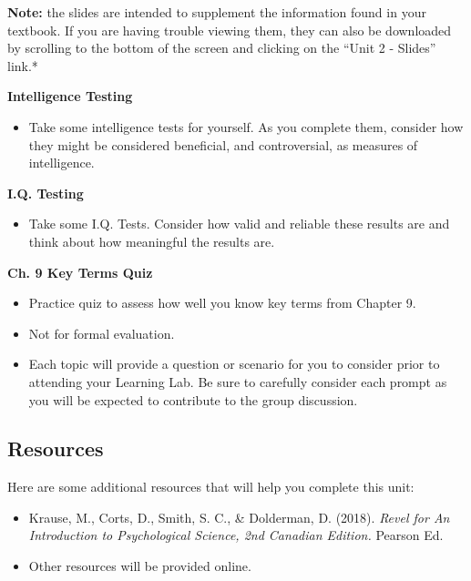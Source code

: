 \documentclass[
]{book}
\providecommand{\tightlist}{%
  \setlength{\itemsep}{0pt}\setlength{\parskip}{0pt}}
\begin{document}
\begin{caution}
\textbf{Note:} the slides are intended to supplement the information found in your textbook. If you are having trouble viewing them, they can also be downloaded by scrolling to the bottom of the screen and clicking on the ``Unit 2 - Slides'' link.*
\end{caution}

\begin{reflect}
\textbf{Intelligence Testing}

\begin{itemize}
\tightlist
\item
  Take some intelligence tests for yourself. As you complete them, consider how they might be considered beneficial, and controversial, as measures of intelligence.
\end{itemize}

\textbf{I.Q. Testing}

\begin{itemize}
\tightlist
\item
  Take some I.Q. Tests. Consider how valid and reliable these results are and think about how meaningful the results are.
\end{itemize}

\textbf{Ch. 9 Key Terms Quiz}

\begin{itemize}
\tightlist
\item
  Practice quiz to assess how well you know key terms from Chapter 9.\\
\item
  Not for formal evaluation.\\
\item
  Each topic will provide a question or scenario for you to consider prior to attending your Learning Lab. Be sure to carefully consider each prompt as you will be expected to contribute to the group discussion.
\end{itemize}
\end{reflect}

\hypertarget{resources-1}{%
\subsection*{Resources}\label{resources-1}}

Here are some additional resources that will help you complete this unit:

\begin{itemize}
\tightlist
\item
  Krause, M., Corts, D., Smith, S. C., \& Dolderman, D. (2018). \emph{Revel for An Introduction to Psychological Science, 2nd Canadian Edition.} Pearson Ed.\\
\item
  Other resources will be provided online.
\end{itemize}
\end{document}
